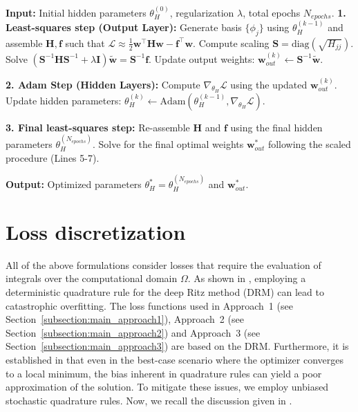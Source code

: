 \documentclass{article}
\theoremstyle{definition}
\begin{document}
\begin{algorithm}[H]
\caption{Full hybrid LS/Adam training loop}
\begin{algorithmic}[1]
    \State \textbf{Input:} Initial hidden parameters $\theta_H^{(0)}$, regularization $\lambda$, total epochs $N_{epochs}$.
        \State \textbf{1. Least-squares step (Output Layer):}
        \State \quad Generate basis $\{\phi_j\}$ using $\theta_H^{(k-1)}$ and assemble $\mathbf{H}, \mathbf{f}$ such that $\mathcal{L} \approx \frac{1}{2}\mathbf{w}^\top \mathbf{H} \mathbf{w} - \mathbf{f}^\top \mathbf{w}$.
        \State \quad Compute scaling $\mathbf{S} = \text{diag}(\sqrt{H_{jj}})$.
        \State \quad Solve $(\mathbf{S}^{-1}\mathbf{H}\mathbf{S}^{-1} + \lambda \mathbf{I})\tilde{\mathbf{w}} = \mathbf{S}^{-1}\mathbf{f}$.
        \State \quad Update output weights: $\mathbf{w}_{out}^{(k)} \gets \mathbf{S}^{-1}\tilde{\mathbf{w}}$.
        
        \State \textbf{2. Adam Step (Hidden Layers):}
        \State \quad Compute $\nabla_{\theta_H} \mathcal{L}$ using the updated $\mathbf{w}_{out}^{(k)}$.
        \State \quad Update hidden parameters: $\theta_H^{(k)} \gets \text{Adam}(\theta_H^{(k-1)}, \nabla_{\theta_H} \mathcal{L})$.
    \EndFor
    
    \State \textbf{3. Final least-squares step:}
    \State \quad Re-assemble $\mathbf{H}$ and $\mathbf{f}$ using the final hidden parameters $\theta_H^{(N_{epochs})}$.
    \State \quad Solve for the final optimal weights $\mathbf{w}_{out}^*$ following the scaled procedure (Lines 5-7).
    
    \State \textbf{Output:} Optimized parameters $\theta_H^* = \theta_H^{(N_{epochs})}$ and $\mathbf{w}_{out}^*$.
\end{algorithmic}
\label{alg:hybrid_training_loop}
\end{algorithm}


\section{Loss discretization} \label{sec:Loss_Discretization} 

All of the above formulations consider losses that require the evaluation of integrals over the computational domain $\Omega$. As shown in \cite{Rivera2022}, employing a deterministic quadrature rule for the deep Ritz method (DRM) can lead to catastrophic overfitting. The loss functions used in Approach~1 (see Section~\ref{subsection:main_approach1}), Approach~2 (see Section~\ref{subsection:main_approach2}) and Approach~3 (see Section~\ref{subsection:main_approach3}) are based on the DRM. Furthermore, it is established in \cite{taylor2025stochastic} that even in the best-case scenario where the optimizer converges to a local minimum, the bias inherent in quadrature rules can yield a poor approximation of the solution. To mitigate these issues, we employ unbiased stochastic quadrature rules. Now, we recall the discussion given in \cite{taylor2025stochastic}.
\end{document}
